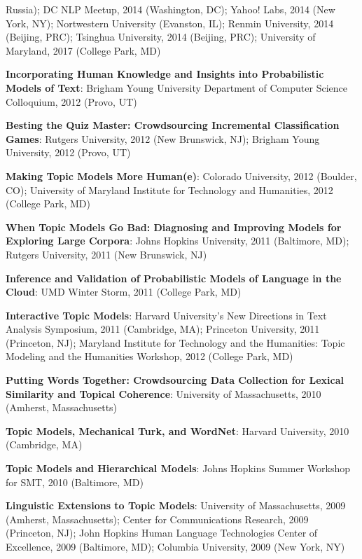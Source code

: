 {{\begin{enumerate*}
          Russia); DC NLP Meetup, 2014 (Washington, DC); Yahoo! Labs, 2014 (New
          York, NY); Nortwestern University (Evanston, IL); Renmin
          University, 2014 (Beijing, PRC); Tsinghua University, 2014
          (Beijing, PRC); University of Maryland, 2017 (College Park, MD)
	\item {\bf Incorporating Human Knowledge and Insights into Probabilistic Models of Text}: Brigham Young University Department of Computer Science Colloquium, 2012 (Provo, UT)
	\item {\bf Besting the Quiz Master: Crowdsourcing Incremental Classification Games}: Rutgers University, 2012 (New Brunswick, NJ); Brigham Young University, 2012 (Provo, UT)
	\item {\bf Making Topic Models More Human(e)}: Colorado University, 2012 (Boulder, CO); University of Maryland Institute for Technology and Humanities, 2012 (College Park, MD)
	\item {\bf When Topic Models Go Bad: Diagnosing and Improving Models for Exploring Large Corpora}: Johns Hopkins University, 2011 (Baltimore, MD); Rutgers University, 2011 (New Brunswick, NJ)
	\item {\bf Inference and Validation of Probabilistic Models of Language in the Cloud}: UMD Winter Storm, 2011 (College Park, MD)
	\item {\bf Interactive Topic Models}: Harvard University's New Directions in Text Analysis Symposium, 2011 (Cambridge, MA); Princeton University, 2011 (Princeton, NJ); Maryland Institute for Technology and the Humanities: Topic Modeling and the Humanities Workshop, 2012 (College Park, MD)
	\item {\bf Putting Words Together: Crowdsourcing Data Collection for Lexical Similarity and Topical Coherence}: University of Massachusetts, 2010 (Amherst, Massachusetts)
	\item {\bf Topic Models, Mechanical Turk, and WordNet}: Harvard University, 2010 (Cambridge, MA)
	\item {\bf Topic Models and Hierarchical Models}: Johns Hopkins Summer Workshop for SMT, 2010 (Baltimore, MD)
	\item {\bf Linguistic Extensions to Topic Models}: University of
          Massachusetts, 2009 (Amherst, Massachusetts); Center for
          Communications Research, 2009 (Princeton, NJ); John Hopkins Human
          Language Technologies Center of Excellence, 2009 (Baltimore, MD); Columbia University, 2009 (New York, NY)
\end{enumerate*}


}
}



